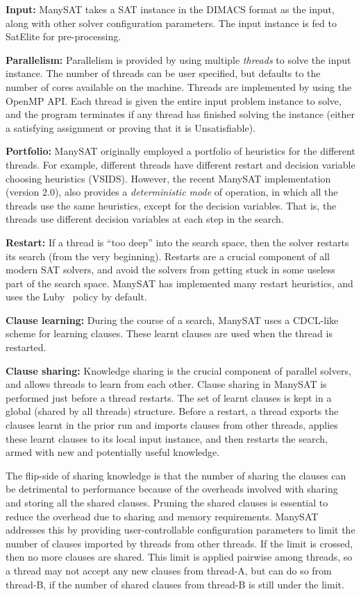 \documentclass{article}
\begin{document}
\textbf{Input: } ManySAT takes a SAT instance in the DIMACS format as
the input, along with other solver configuration parameters. The input
instance is fed to SatElite for pre-processing.


\textbf{Parallelism: } Parallelism is provided by using multiple
\emph{threads} to solve the input instance. The number of threads can
be user specified, but defaults to the number of cores available on
the machine. Threads are implemented by using the OpenMP API. Each
thread is given the entire input problem instance to solve, and the
program terminates if any thread has finished solving the instance
(either a satisfying assignment or proving that it is Unsatisfiable).


\textbf{Portfolio: } ManySAT originally employed a portfolio of
heuristics for the different threads. For example, different threads
have different restart and decision variable choosing heuristics
(VSIDS). However, the recent ManySAT implementation (version 2.0),
also provides a \emph{deterministic mode} of operation, in which all
the threads use the same heuristics, except for the decision
variables. That is, the threads use different decision variables at
each step in the search.


\textbf{Restart: } If a thread is ``too deep'' into the search space,
then the solver restarts its search (from the very
beginning). Restarts are a crucial component of all modern SAT
solvers, and avoid the solvers from getting stuck in some useless part
of the search space. ManySAT has implemented many restart heuristics,
and uses the Luby~\cite{luby} policy by default.

\textbf{Clause learning: } During the course of a search, ManySAT uses
a CDCL-like scheme for learning clauses. These learnt clauses are used
when the thread is restarted.

\textbf{Clause sharing: } Knowledge sharing is the crucial component
of parallel solvers, and allows threads to learn from each
other. Clause sharing in ManySAT is performed just before a thread
restarts. The set of learnt clauses is kept in a global (shared by all
threads) structure. Before a restart, a thread exports the clauses
learnt in the prior run and imports clauses from other threads,
applies these learnt clauses to its local input instance, and then
restarts the search, armed with new and potentially useful
knowledge. 

The flip-side of sharing knowledge is that the number of sharing the
clauses can be detrimental to performance because of the overheads
involved with sharing and storing all the shared clauses. Pruning the
shared clauses is essential to reduce the overhead due to sharing and
memory requirements. ManySAT addresses this by providing
user-controllable configuration parameters to limit the number of
clauses imported by threads from other threads. If the limit is
crossed, then no more clauses are shared. This limit is applied
pairwise among threads, so a thread may not accept any new clauses
from thread-A, but can do so from thread-B, if the number of shared
clauses from thread-B is still under the limit.
\end{document}

